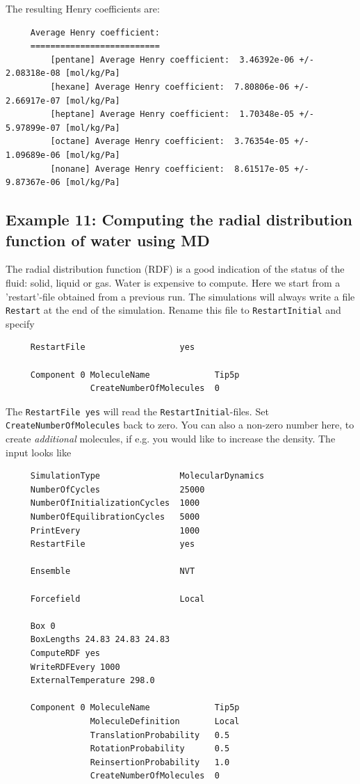 \noindent
The resulting Henry coefficients are:
\begin{tiny}
\begin{verbatim}
     Average Henry coefficient:
     ==========================
         [pentane] Average Henry coefficient:  3.46392e-06 +/- 2.08318e-08 [mol/kg/Pa]
         [hexane] Average Henry coefficient:  7.80806e-06 +/- 2.66917e-07 [mol/kg/Pa]
         [heptane] Average Henry coefficient:  1.70348e-05 +/- 5.97899e-07 [mol/kg/Pa]
         [octane] Average Henry coefficient:  3.76354e-05 +/- 1.09689e-06 [mol/kg/Pa]
         [nonane] Average Henry coefficient:  8.61517e-05 +/- 9.87367e-06 [mol/kg/Pa]
\end{verbatim}
\end{tiny}

\subsection*{Example 11: Computing the radial distribution function of water using MD}

The radial distribution function (RDF) is a good indication of the status of the fluid: solid, liquid or gas.
Water is expensive to compute. Here we start from a 'restart'-file obtained from a previous run.
The simulations will always write a file \verb+Restart+
at the end of the simulation. Rename this file to \verb+RestartInitial+ and specify
\begin{tiny}
\begin{verbatim}
     RestartFile                   yes

     Component 0 MoleculeName             Tip5p
                 CreateNumberOfMolecules  0
\end{verbatim}
\end{tiny}
The \verb+RestartFile yes+ will read the \verb+RestartInitial+-files. Set \verb+CreateNumberOfMolecules+ back to zero.
You can also a non-zero number here, to create \emph{additional} molecules, if e.g. you would like to increase the density.
The input looks like
\begin{tiny}
\begin{verbatim}
     SimulationType                MolecularDynamics
     NumberOfCycles                25000
     NumberOfInitializationCycles  1000
     NumberOfEquilibrationCycles   5000
     PrintEvery                    1000
     RestartFile                   yes
     
     Ensemble                      NVT
     
     Forcefield                    Local
     
     Box 0
     BoxLengths 24.83 24.83 24.83
     ComputeRDF yes
     WriteRDFEvery 1000
     ExternalTemperature 298.0
     
     Component 0 MoleculeName             Tip5p
                 MoleculeDefinition       Local
                 TranslationProbability   0.5
                 RotationProbability      0.5
                 ReinsertionProbability   1.0
                 CreateNumberOfMolecules  0
\end{verbatim}
\end{tiny}

